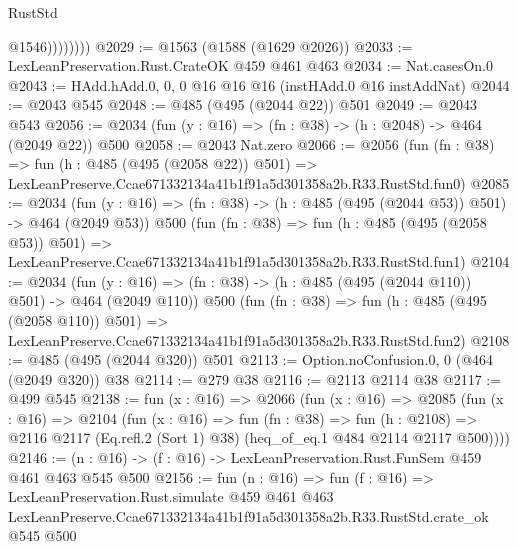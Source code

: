 \begin{lexlean}{RustStd}
\begin{coremodule}
                    @1546))))))))
@2029 := @1563 (@1588 (@1629 @2026))
@2033 := LexLeanPreservation.Rust.CrateOK @459 @461 @463
@2034 := Nat.casesOn.{0}
@2043 := HAdd.hAdd.{0, 0, 0} @16 @16 @16 (instHAdd.{0} @16 instAddNat)
@2044 := @2043 @545
@2048 := @485 (@495 (@2044 @22)) @501
@2049 := @2043 @543
@2056 := @2034 (fun (y : @16) => (fn : @38) -> (h : @2048) -> @464 (@2049 @22)) @500
@2058 := @2043 Nat.zero
@2066 := @2056
    (fun (fn : @38) =>
    fun (h : @485 (@495 (@2058 @22)) @501) =>
    LexLeanPreserve.Ccae671332134a41b1f91a5d301358a2b.R33.RustStd.fun0)
@2085 := @2034
    (fun (y : @16) => (fn : @38) -> (h : @485 (@495 (@2044 @53)) @501) -> @464 (@2049 @53))
    @500
    (fun (fn : @38) =>
    fun (h : @485 (@495 (@2058 @53)) @501) =>
    LexLeanPreserve.Ccae671332134a41b1f91a5d301358a2b.R33.RustStd.fun1)
@2104 := @2034
    (fun (y : @16) => (fn : @38) -> (h : @485 (@495 (@2044 @110)) @501) -> @464 (@2049 @110))
    @500
    (fun (fn : @38) =>
    fun (h : @485 (@495 (@2058 @110)) @501) =>
    LexLeanPreserve.Ccae671332134a41b1f91a5d301358a2b.R33.RustStd.fun2)
@2108 := @485 (@495 (@2044 @320)) @501
@2113 := Option.noConfusion.{0, 0} (@464 (@2049 @320)) @38
@2114 := @279 @38
@2116 := @2113 @2114 @38
@2117 := @499 @545
@2138 := fun (x : @16) =>
  @2066
    (fun (x : @16) =>
    @2085
      (fun (x : @16) =>
      @2104
        (fun (x : @16) =>
        fun (fn : @38) =>
        fun (h : @2108) =>
        @2116 @2117 (Eq.refl.{2} (Sort 1) @38) (heq_of_eq.{1} @484 @2114 @2117 @500))))
@2146 := (n : @16) -> (f : @16) -> LexLeanPreservation.Rust.FunSem @459 @461 @463 @545 @500
@2156 := fun (n : @16) =>
  fun (f : @16) =>
  LexLeanPreservation.Rust.simulate
    @459
    @461
    @463
    LexLeanPreserve.Ccae671332134a41b1f91a5d301358a2b.R33.RustStd.crate_ok
    @545
    @500
\end{coremodule}
\end{lexlean}

